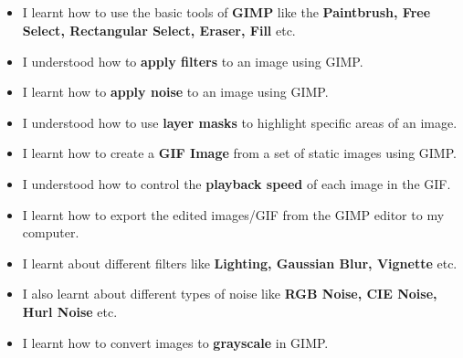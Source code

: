 \documentclass[12pt, a4]{article}
\begin{document}
\subsection*{}
\begin{itemize}
\item I learnt how to use the basic tools of \textbf{GIMP} like the \textbf{Paintbrush, Free Select, Rectangular Select, Eraser, Fill} etc.
\item I understood how to \textbf{apply filters} to an image using GIMP.
\item I learnt how to \textbf{apply noise} to an image using GIMP.
\item I understood how to use \textbf{layer masks} to highlight specific areas of an image.
\item I learnt how to create a \textbf{GIF Image} from a set of static images using GIMP.
\item I understood how to control the \textbf{playback speed} of each image in the GIF.
\item I learnt how to export the edited images/GIF from the GIMP editor to my computer.
\item I learnt about different filters like \textbf{Lighting, Gaussian Blur, Vignette} etc.
\item I also learnt about different types of noise like \textbf{RGB Noise, CIE Noise, Hurl Noise} etc.
\item I learnt how to convert images to \textbf{grayscale} in GIMP.
\end{itemize}
\end{document}
